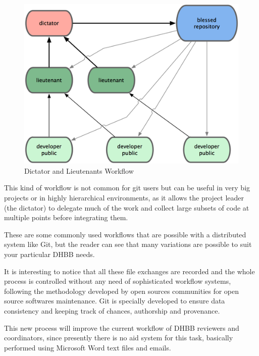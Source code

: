 \documentclass{llncs}
\begin{document}
\begin{figure}[thbp]
  \centering
  \includegraphics[width=.8\textwidth]{git-model-2.png}
  \caption{Dictator and Lieutenants Workflow}\label{fig:git-model-2}
\end{figure}

This kind of workflow is not common for git users but can be useful in
very big projects or in highly hierarchical environments, as it allows
the project leader (the dictator) to delegate much of the work and
collect large subsets of code at multiple points before integrating
them.

These are some commonly used workflows that are possible with a
distributed system like Git, but the reader can see that many
variations are possible to suit your particular DHBB needs. 

It is interesting to notice that all these file exchanges are recorded
and the whole process is controlled without any need of sophisticated
workflow systems, following the methodology developed by open sources
communities for open source softwares maintenance. Git is specially
developed to ensure data consistency and keeping track of chances,
authorship and provenance.

This new process will improve the current workflow of DHBB reviewers
and coordinators, since presently there is no aid system for this
task, basically performed using Microsoft Word text files and emails.
\end{document}
